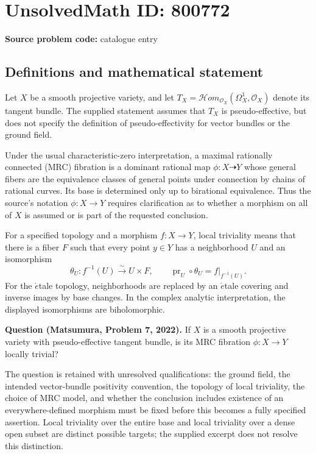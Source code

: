 \documentclass[11pt]{article}
\begin{document}
\section*{UnsolvedMath ID: 800772}
\textbf{Source problem code:} catalogue entry
\subsection{Definitions and mathematical statement}
Let \(X\) be a smooth projective variety, and let \(T_X=\mathcal{H}om_{\mathcal O_X}(\Omega_X^1,\mathcal O_X)\) denote its tangent bundle. The supplied statement assumes that \(T_X\) is pseudo-effective, but does not specify the definition of pseudo-effectivity for vector bundles or the ground field.

Under the usual characteristic-zero interpretation, a maximal rationally connected (MRC) fibration is a dominant rational map \(\phi\colon X\dashrightarrow Y\) whose general fibers are the equivalence classes of general points under connection by chains of rational curves. Its base is determined only up to birational equivalence. Thus the source's notation \(\phi\colon X\to Y\) requires clarification as to whether a morphism on all of \(X\) is assumed or is part of the requested conclusion.

For a specified topology and a morphism \(f\colon X\to Y\), local triviality means that there is a fiber \(F\) such that every point \(y\in Y\) has a neighborhood \(U\) and an isomorphism
\[
\theta_U\colon f^{-1}(U)\xrightarrow{\sim}U\times F,
\qquad \operatorname{pr}_U\circ\theta_U=f|_{f^{-1}(U)}.
\]
For the \(\acute{e}\)tale topology, neighborhoods are replaced by an \(\acute{e}\)tale covering and inverse images by base changes. In the complex analytic interpretation, the displayed isomorphisms are biholomorphic.

\textbf{Question (Matsumura, Problem 7, 2022).} If \(X\) is a smooth projective variety with pseudo-effective tangent bundle, is its MRC fibration \(\phi\colon X\to Y\) locally trivial?

The question is retained with unresolved qualifications: the ground field, the intended vector-bundle positivity convention, the topology of local triviality, the choice of MRC model, and whether the conclusion includes existence of an everywhere-defined morphism must be fixed before this becomes a fully specified assertion. Local triviality over the entire base and local triviality over a dense open subset are distinct possible targets; the supplied excerpt does not resolve this distinction.
\end{document}
